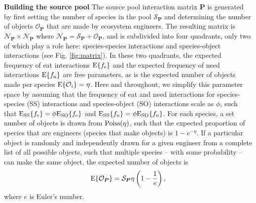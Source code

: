 \documentclass[twocolumn,preprintnumbers,amsmath,amssymb,superscriptaddress]{revtex4}
\newcommand{\rr}[1]{{\rm #1}}
\begin{document}
\textbf{Building the source pool} The source pool interaction matrix $\bm P$ is generated by first setting the number of species in the pool $\mathcal{S}_{\bm P}$ and determining the number of objects $\mathcal{O}_{\bm P}$ that are made by ecosystem engineers.
The resulting matrix is $\mathcal{N}_{\bm P}\times\mathcal{N}_{\bm P}$ where $\mathcal{N}_{\bm P}=\mathcal{S}_{\bm P}+\mathcal{O}_{\bm P}$, and is subdivided into four quadrants, only two of which play a role here: species-species interactions and species-object interactions (see Fig. \ref{fig:matrix}).
In these two quadrants, the expected frequency of eat interactions ${\rm E}\{f_\rr{e}\}$ and the expected frequency of need interactions ${\rm E}\{f_\rr{n}\}$ are free parameters, as is the expected number of objects made per species ${\rm E}\{\mathcal{O}_i\}=\eta$.
Here and throughout, we simplify this parameter space by assuming that the frequency of eat and need interactions for species-species (SS) interactions and species-object (SO) interactions scale as $\phi$, such that ${\rm E_{SS}}\{f_\rr{e}\} = \phi{\rm E_{SO}}\{f_\rr{e}\}$ and ${\rm E_{SS}}\{f_\rr{n}\} = \phi{\rm E_{SO}}\{f_\rr{n}\}$.
For each species, a set number of objects is drawn from ${\rm Poiss}(\eta)$, such that the expected proportion of species that are engineers (species that make objects) is $1-{e}^{-\eta}$. 
If a particular object is randomly and independently drawn for a given engineer from a complete list of all possible objects, such that multiple species -- with some probability -- can make the same object, the expected number of objects is
\begin{equation}
{\rm E}\{\mathcal{O}_{\bm P}\} = \mathcal{S}_{\bm P}\eta\left(1 - \frac{1}{{e}}\right),
\end{equation}
where $e$ is Euler's number.
\end{document}

